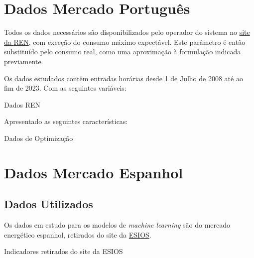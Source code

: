 
\section{Dados Mercado Português\label{se:dados_pt}}

Todos os dados necessários são disponibilizados pelo operador do sistema no \href{https://mercado.ren.pt/PT/Electr}{site da \gls{REN}}, com exceção do consumo máximo expectável. Este parâmetro é então substituído pelo consumo real, como uma aproximação à formulação indicada previamente.\par
Os dados estudados contêm entradas horárias desde 1 de Julho de 2008 até ao fim de 2023. Com as seguintes variáveis:\\

\begin{table}[H] \centering \caption{Dados REN}  \end{table}

Apresentado as seguintes características:\par
\begin{table}[H]
    \centering
    \caption{Dados de Optimização}    
    \resizebox{0.7\linewidth}{!}{}
    \end{table}


\section{Dados Mercado Espanhol\label{se:dados_es}}


\subsection{Dados Utilizados\label{se:dadosestudo}}

Os dados em estudo para os modelos de \textit{machine learning} são do mercado energético espanhol, retirados do site da \href{https://www.esios.ree.es/es}{\gls{ESIOS}}.


\begin{table}[H]
    \centering
    \caption{Indicadores retirados do site da ESIOS}    
\end{table}


